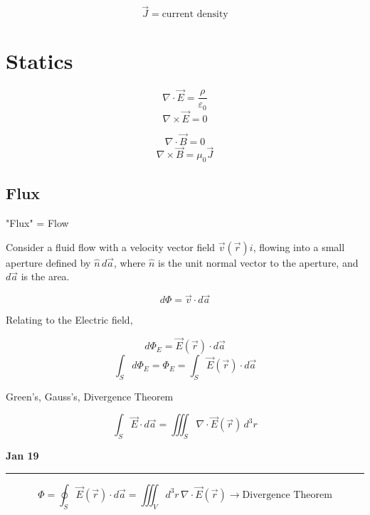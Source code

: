 \documentclass[svgnames]{article}   	%
\begin{document}
\vspace{5px} \[
  \vec{J} = \text{current density}
\] \vspace{5px}

\section{Statics}

\begin{tcolorbox}[colback = red!5!white, colframe = red!50!black, title
  = Equations of Electrostatics]
  
  \[
    \nabla \cdot \vec{E} = \frac{\rho}{\varepsilon_0}
  \]
  \[
    \nabla \times \vec{E} = 0
  \] 
  
\end{tcolorbox}

\begin{tcolorbox}[colback = blue!5!white, colframe = blue!50!black, title
  = Equations of Magnetostatics]
  
  \[
    \nabla \cdot \vec{B} = 0
  \]
  \[
    \nabla \times \vec{B} = \mu_0\vec{J}
  \] 

\end{tcolorbox}

\subsection{Flux}
\vspace{5px}
"Flux" = Flow 

\vspace{10px} 

Consider a fluid flow with a velocity vector field $\vec{v}(\vec{r})i$, flowing
into a small aperture defined by $\hat{n}\,d\vec{a}$, where  $\hat{n}$ is the
unit normal vector to the aperture, and $d\vec{a}$ is the area. 

\[
  d\Phi = \vec{v} \cdot d\vec{a}
\]

Relating to the Electric field, 

\[
  d\Phi_E = \vec{E}(\vec{r}) \cdot d\vec{a}
\] 
\[
  \int_S d\Phi_E = \Phi_E = \int_S \vec{E}(\vec{r}) \cdot d\vec{a}
\]\vspace{5px}

Green's, Gauss's, Divergence Theorem

\[
  \int_S \vec{E} \cdot d\vec{a} = \iiint_S \nabla \cdot \vec{E}(\vec{r}) \, d^3
  r
\]

\newpage
\noindent \textbf{Jan 19} \hrule
\vspace{5px} \[
  \Phi = \oint_S \vec{E}(\vec{r}) \cdot d\vec{a} = \iiint_V d^3r \, \nabla \cdot
  \vec{E}(\vec{r}) \rightarrow \text{Divergence Theorem}
\] \vspace{5px}
\end{document}
